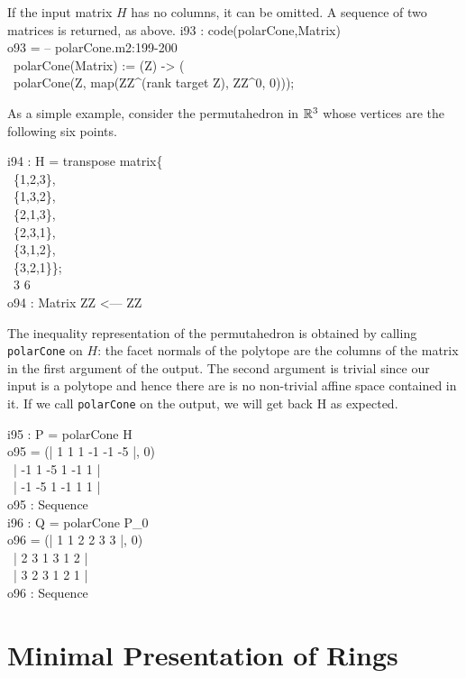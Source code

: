 If the input matrix $H$ has no columns, it can be omitted.  A sequence of two
matrices is returned, as above.
\beginOutput
i93 : code(polarCone,Matrix)\\
\emptyLine
o93 = -- polarCone.m2:199-200\\
\      polarCone(Matrix) := (Z) -> (\\
\           polarCone(Z, map(ZZ^(rank target Z), ZZ^0, 0)));\\
\endOutput

As a simple example, consider the permutahedron in $\mathbb{R}^3$ 
whose vertices are the following six points. 

\beginOutput
i94 : H = transpose matrix\{\\
\      \{1,2,3\},\\
\      \{1,3,2\},\\
\      \{2,1,3\},\\
\      \{2,3,1\},\\
\      \{3,1,2\},\\
\      \{3,2,1\}\};\\
\emptyLine
\               3        6\\
o94 : Matrix ZZ  <--- ZZ\\
\endOutput

The inequality representation of the permutahedron is obtained 
by calling {\tt polarCone} on $H$: the facet normals of the 
polytope are the columns of the matrix in the first argument of the 
output. The second argument is trivial since our input is a polytope 
and hence there are is no non-trivial affine space contained in it.
If we call {\tt polarCone} on the output, we will get back H as
expected. 

\beginOutput
i95 : P = polarCone H\\
\emptyLine
o95 = (| 1  1  1  -1 -1 -5 |, 0)\\
\       | -1 1  -5 1  -1 1  |\\
\       | -1 -5 1  -1 1  1  |\\
\emptyLine
o95 : Sequence\\
\endOutput
\beginOutput
i96 : Q = polarCone P_0\\
\emptyLine
o96 = (| 1 1 2 2 3 3 |, 0)\\
\       | 2 3 1 3 1 2 |\\
\       | 3 2 3 1 2 1 |\\
\emptyLine
o96 : Sequence\\
\endOutput
 

\section{Minimal Presentation of Rings}\label{Mpor}

